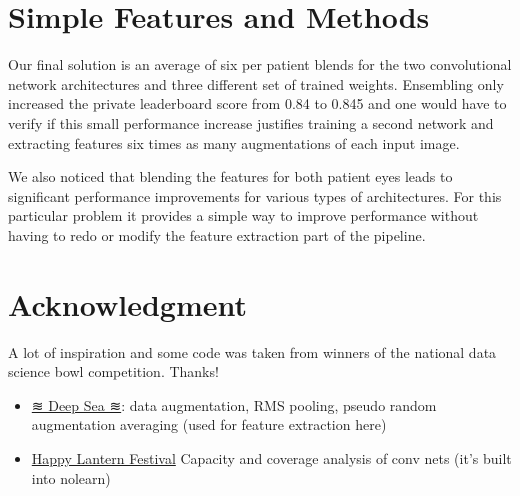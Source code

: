 \documentclass[12pt,a4paper]{scrartcl}
\begin{document}
\section{Simple Features and Methods}
Our final solution is an average of six per patient blends for the two convolutional network architectures and three different set of trained weights. Ensembling only increased the private leaderboard score from 0.84 to 0.845 and one would have to verify if this small performance increase justifies training a second network and extracting features six times as many augmentations of each input image.

We also noticed that blending the features for both patient eyes leads to significant performance improvements for various types of architectures. For this particular problem it provides a simple way to improve performance without having to redo or modify the feature extraction part of the pipeline.
\section{Acknowledgment}A lot of inspiration and some code was taken from winners of the
national data science bowl competition. Thanks!
\begin{itemize}
\item
  \href{https://github.com/benanne/kaggle-ndsb}{≋ Deep Sea ≋}: data
  augmentation, RMS pooling, pseudo random augmentation averaging (used
  for feature extraction here)
\item
  \href{https://www.kaggle.com/c/datasciencebowl/forums/t/13166/happy-lantern-festival-report-and-code}{Happy
  Lantern Festival} Capacity and coverage analysis of conv nets (it's
  built into nolearn)
\end{itemize}
\end{document}
